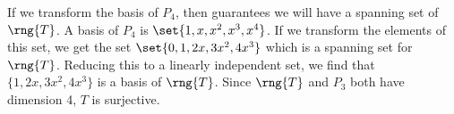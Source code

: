 If we transform the basis of $P_4$, then  guarantees we will have a spanning set of $\rng{T}$.  A basis of $P_4$ is $\set{1, x, x^2, x^3, x^4}$.  If we transform the elements of this set, we get the set $\set{0, 1, 2x, 3x^2, 4x^3}$ which is a spanning set for $\rng{T}$.  Reducing this to a linearly independent set, we find that $\{1, 2x, 3x^2, 4x^3\}$ is a basis of $\rng{T}$.  Since $\rng{T}$ and $P_3$ both have dimension 4, $T$ is surjective.  